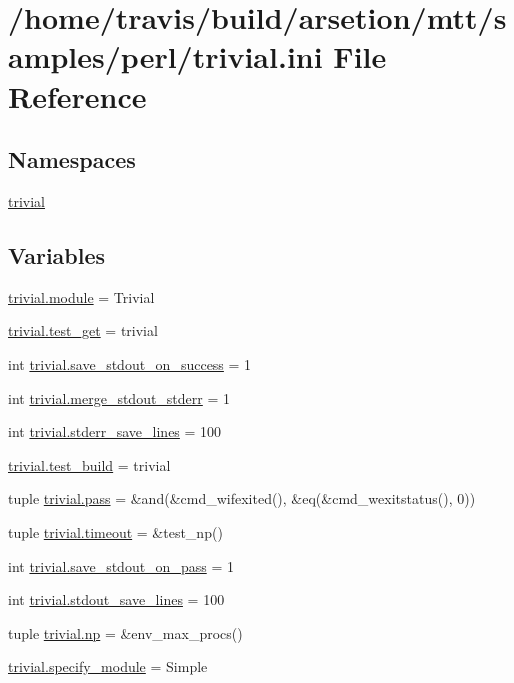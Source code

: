 \hypertarget{trivial_8ini}{\section{/home/travis/build/arsetion/mtt/samples/perl/trivial.ini File Reference}
\label{trivial_8ini}
}
\subsection*{Namespaces}
\begin{DoxyCompactItemize}
\item 
\hyperlink{namespacetrivial}{trivial}
\end{DoxyCompactItemize}
\subsection*{Variables}
\begin{DoxyCompactItemize}
\item 
\hyperlink{namespacetrivial_a3e713ea5d6e77bf165eeaafc02275430}{trivial.\-module} = Trivial
\item 
\hyperlink{namespacetrivial_afe75cace659f04749ee3f7c818152b7b}{trivial.\-test\-\_\-get} = trivial
\item 
int \hyperlink{namespacetrivial_af272dc5ab194f706f77eeb74de7b8c97}{trivial.\-save\-\_\-stdout\-\_\-on\-\_\-success} = 1
\item 
int \hyperlink{namespacetrivial_a8c1d5357654e053cf4d0b8a7f48ff13b}{trivial.\-merge\-\_\-stdout\-\_\-stderr} = 1
\item 
int \hyperlink{namespacetrivial_af6ee4456e84c354e7845aae7ea24d022}{trivial.\-stderr\-\_\-save\-\_\-lines} = 100
\item 
\hyperlink{namespacetrivial_aa612b0f8daffd666959f885b6ba54cd0}{trivial.\-test\-\_\-build} = trivial
\item 
tuple \hyperlink{namespacetrivial_a65b4003f52ce4fa5d324695f54c1e3b3}{trivial.\-pass} = \&and(\&cmd\-\_\-wifexited(), \&eq(\&cmd\-\_\-wexitstatus(), 0))
\item 
tuple \hyperlink{namespacetrivial_a8ce5c7e487f1c21edda391cc47830f5e}{trivial.\-timeout} = \&test\-\_\-np()
\item 
int \hyperlink{namespacetrivial_aefbe39eb9fcb8a58d4e04dd980e35062}{trivial.\-save\-\_\-stdout\-\_\-on\-\_\-pass} = 1
\item 
int \hyperlink{namespacetrivial_aee208868790b8c2d6d9f48ad238aa6c5}{trivial.\-stdout\-\_\-save\-\_\-lines} = 100
\item 
tuple \hyperlink{namespacetrivial_adfe4da0e2d8f3078b198c0f76ee394dd}{trivial.\-np} = \&env\-\_\-max\-\_\-procs()
\item 
\hyperlink{namespacetrivial_af5dae1522345f303cfb4527587cd5361}{trivial.\-specify\-\_\-module} = Simple
\end{DoxyCompactItemize}
